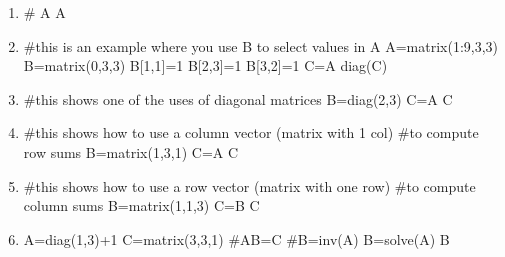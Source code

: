 \begin{enumerate}
\item
\begin{Schunk}
\begin{Sinput}
 # A%*%A #throws an error
 A%*%t(A) #works
\end{Sinput}
\end{Schunk}

\item
\begin{Schunk}
\begin{Sinput}
 #this is an example where you use B to select values in A
 A=matrix(1:9,3,3)
 B=matrix(0,3,3)
 B[1,1]=1
 B[2,3]=1
 B[3,2]=1
 C=A%*%B
 diag(C)
\end{Sinput}
\end{Schunk}

\item
\begin{Schunk}
\begin{Sinput}
 #this shows one of the uses of diagonal matrices
 B=diag(2,3)
 C=A%*%B
 C
\end{Sinput}
\end{Schunk}

\item
\begin{Schunk}
\begin{Sinput}
 #this shows how to use a column vector (matrix with 1 col) 
 #to compute row sums
 B=matrix(1,3,1)
 C=A%*%B
 C
\end{Sinput}
\end{Schunk}

\item
\begin{Schunk}
\begin{Sinput}
 #this shows how to use a row vector (matrix with one row) 
 #to compute column sums
 B=matrix(1,1,3)
 C=B%*%A
 C
\end{Sinput}
\end{Schunk}
 
\item
\begin{Schunk}
\begin{Sinput}
 A=diag(1,3)+1
 C=matrix(3,3,1)
 #AB=C
 #B=inv(A)%*%C
 B=solve(A)%*%C
 B
\end{Sinput}
\end{Schunk}

\end{enumerate}






